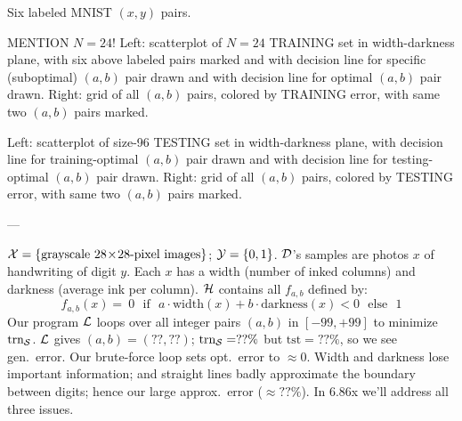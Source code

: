 \documentclass[11pt, justified]{tufte-book}
\newcommand{\attn}[1]{{\red \textsf{#1}}}
\newcommand{\samsubsubsection}[1]{
   \vspace{0.1cm}
   \par\noindent{\hspace{-2cm}\normalsize \sc \gre #1} ---
}
\newcommand{\Ein}  {\text{trn}_{\sS}}
\newcommand{\Eout} {\text{tst}}
\theoremstyle{definition}
\begin{document}
      \begin{marginfigure}
          \par \attn{Six labeled MNIST $(x,y)$ pairs.                          }\vspace{1.5cm}
          \par \attn{
            MENTION $N=24$!
            Left: scatterplot of $N=24$ TRAINING set in width-darkness plane,
              with six above labeled pairs marked and
              with decision line for specific (suboptimal) $(a,b)$ pair drawn and
              with decision line for              optimal  $(a,b)$ pair drawn. 
            Right: grid of all $(a,b)$ pairs, colored by TRAINING error, 
              with same two $(a,b)$ pairs marked.
          }\vspace{1.5cm}
          \par \attn{
            Left: scatterplot of size-96 TESTING set in width-darkness plane,
              with decision line for     training-optimal  $(a,b)$ pair drawn and 
              with decision line for     testing- optimal  $(a,b)$ pair drawn. 
            Right: grid of all $(a,b)$ pairs, colored by TESTING error,
              with same two $(a,b)$ pairs marked. 
          }\vspace{1.5cm}
      \end{marginfigure}
    \samsubsubsection{tiny example}
      $\mathcal{X} = \{\text{grayscale~}28\!\times\!28\text{-pixel images}\}$; $\mathcal{Y}=\{0,1\}$. %
      $\mathcal{D}$'s samples are photos $x$ of handwriting of digit $y$. 
      Each $x$ has a
      width (number of inked columns)
      and
      darkness (average ink per column).
      $\mathcal{H}$ contains all $f_{a,b}$ %
      defined by:
      $$
        f_{a,b}(x) = ~0 \text{~~if~~} a\cdot \text{width}(x) + b\cdot\text{darkness}(x) < 0 \text{~~else~~} 1 
      $$ 
      Our program $\mathcal{L}$ loops over all integer pairs $(a,b)$ in $[-99,+99]$
      to minimize $\Ein$.
      $\mathcal{L}$ gives $(a,b)=(??,??)$; $\Ein = ??\%$ but $\Eout = ??\%$, so we see
      gen.\ error.  Our brute-force loop sets opt.\ error to $\approx 0$.
      Width and darkness lose important information; and straight lines badly
      approximate the boundary between digits; hence our large approx.\ error
      ($\approx ??\%$). 
      In 6.86x we'll address all three issues.
\end{document}
